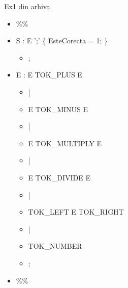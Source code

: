 \documentclass[pdf]{beamer}
\begin{document}
\begin{frame}{Ex1 din arhiva}
\begin{itemize}
	\item[]
	\%\%
	
	\item[]
	S : E ';' \{ EsteCorecta = 1; \}

		\begin{itemize}
			\item[]
			      ;
		\end{itemize}

	\item[]
	E : E TOK\_PLUS E

		\begin{itemize}
			\item[]
			      |

			\item[]
			E TOK\_MINUS E

			\item[]
			      |

			\item[]
			E TOK\_MULTIPLY E

			\item[]
			      |

			\item[]
			E TOK\_DIVIDE E

			\item[]
			      |

			\item[]
			TOK\_LEFT E TOK\_RIGHT

			\item[]
			      |

			\item[]
			TOK\_NUMBER

			\item[]
			      ;
		\end{itemize}

	\item[]
	\%\%

\end{itemize}
\end{frame}
\end{document}
